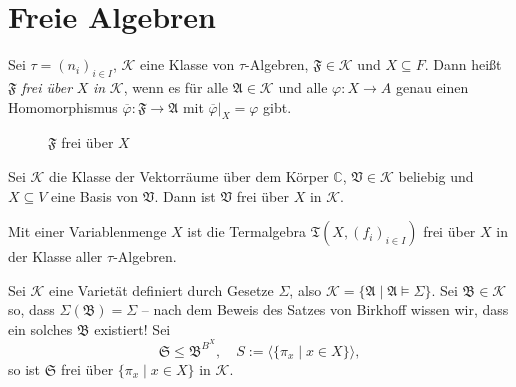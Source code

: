 \section{Freie Algebren}

\begin{definition}
Sei $ \tau = (n_i)_{i \in I}$, $\mathcal{K}$ eine Klasse von $\tau$-Algebren, $\mathfrak{F} \in \mathcal{K}$ und $X \subseteq F$. Dann heißt $\mathfrak{F}$ \emph{frei über} $X$ \emph{in} $\mathcal{K}$, wenn es für alle $\mathfrak{A} \in \mathcal{K}$ und alle $\varphi : X \to A$ genau einen Homomorphismus $\overline{\varphi} : \mathfrak{F} \to \mathfrak{A}$ mit $\overline{\varphi} \vert_X = \varphi$ gibt.

\begin{figure}[H]
    \centering
    \caption{$\mathfrak{F}$ frei über $X$}
\end{figure}
\end{definition}

\begin{example}
    Sei $\mathcal{K}$ die Klasse der Vektorräume über dem Körper $\mathbb{C}$, $\mathfrak{V} \in \mathcal{K}$ beliebig und $X \subseteq V$ eine Basis von $\mathfrak{V}$. Dann ist $\mathfrak{V}$ frei über $X$ in $\mathcal{K}$.

    Mit einer Variablenmenge $X$ ist die Termalgebra $\mathfrak{T}(X, (f_i)_{i \in I})$ frei über $X$ in der Klasse aller $\tau$-Algebren.
\end{example}

\begin{example}
    Sei $\mathcal{K}$ eine Varietät definiert durch Gesetze $\Sigma$, also $\mathcal{K} = \{ \mathfrak{A} \mid \mathfrak{A} \models \Sigma \}$. Sei $\mathfrak{B} \in \mathcal{K}$ so, dass $\Sigma(\mathfrak{B}) = \Sigma$ -- nach dem Beweis des Satzes von Birkhoff wissen wir, dass ein solches $\mathfrak{B}$ existiert! Sei
    $$ \mathfrak{S} \leq \mathfrak{B}^{B^X}, \quad S := \langle \{ \pi_x \mid x \in X \} \rangle, $$
    so ist $\mathfrak{S}$ frei über $\{ \pi_x \mid x \in X \}$ in $\mathcal{K}$.
\end{example}

